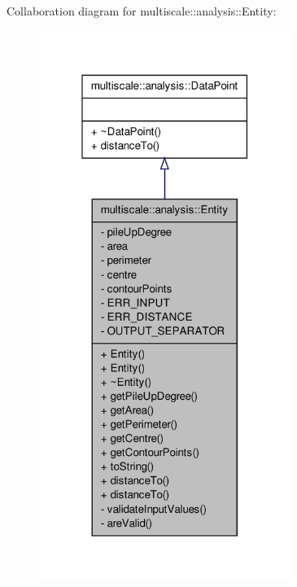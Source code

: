 \-Collaboration diagram for multiscale\-:\-:analysis\-:\-:\-Entity\-:\nopagebreak
\begin{figure}[H]
\begin{center}
\leavevmode
\includegraphics[width=232pt]{classmultiscale_1_1analysis_1_1Entity__coll__graph}
\end{center}
\end{figure}
